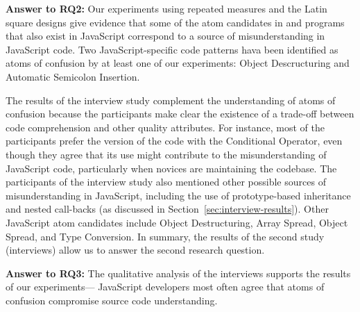 \begin{mh}
  {\bf Answer to RQ2:} Our experiments using repeated measures and the Latin square designs give evidence that some of
  the atom candidates in \clang and \cpplang programs that also exist in JavaScript correspond to a source of misunderstanding in
  JavaScript code. Two JavaScript-specific code patterns hava been identified as atoms of confusion by at least
  one of our experiments: Object Descructuring and Automatic Semicolon Insertion. 
\end{mh}

The results of the interview study complement the understanding of atoms of confusion because the participants make clear the existence of a trade-off between
code comprehension and other quality attributes. For instance, most of the participants prefer the version of the code with the
Conditional Operator, even though they agree that its use might contribute to the misunderstanding of JavaScript code,
particularly when novices are maintaining the codebase. The participants of the interview study also
mentioned other possible sources of misunderstanding in JavaScript,
including the use of prototype-based inheritance and nested call-backs (as discussed in Section~\ref{sec:interview-results}). Other JavaScript atom candidates include
Object Destructuring, Array Spread, Object Spread, and Type Conversion.
In summary, the results of the second study (interviews) allow
us to answer the second research question.

\begin{mh}
  {\bf Answer to RQ3:} The qualitative analysis of the
  interviews supports the results of our experiments---
  JavaScript developers most often agree that atoms of confusion compromise
  source code understanding. 
\end{mh}




\subsection{}\label{sec:whytwo}

